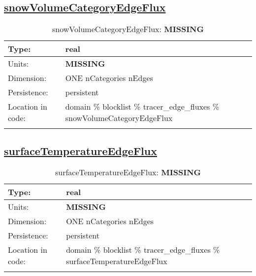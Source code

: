\subsection[snowVolumeCategoryEdgeFlux]{\hyperref[sec:var_tab_tracer_edge_fluxes]{snowVolumeCategoryEdgeFlux}}
\label{subsec:var_sec_tracer_edge_fluxes_snowVolumeCategoryEdgeFlux}
\begin{center}
\begin{longtable}{| p{2.0in} | p{4.0in} |}
        \hline 
        Type: & real \\
        \hline 
        Units: & {\bf \color{red} MISSING} \\
        \hline 
        Dimension: & ONE nCategories nEdges \\
        \hline 
        Persistence: & persistent \\
        \hline 
         Location in code: & domain \% blocklist \% tracer\_edge\_fluxes \% snowVolumeCategoryEdgeFlux \\
         \hline 
    \caption{snowVolumeCategoryEdgeFlux: {\bf \color{red} MISSING}}
\end{longtable}
\end{center}
\subsection[surfaceTemperatureEdgeFlux]{\hyperref[sec:var_tab_tracer_edge_fluxes]{surfaceTemperatureEdgeFlux}}
\label{subsec:var_sec_tracer_edge_fluxes_surfaceTemperatureEdgeFlux}
\begin{center}
\begin{longtable}{| p{2.0in} | p{4.0in} |}
        \hline 
        Type: & real \\
        \hline 
        Units: & {\bf \color{red} MISSING} \\
        \hline 
        Dimension: & ONE nCategories nEdges \\
        \hline 
        Persistence: & persistent \\
        \hline 
         Location in code: & domain \% blocklist \% tracer\_edge\_fluxes \% surfaceTemperatureEdgeFlux \\
         \hline 
    \caption{surfaceTemperatureEdgeFlux: {\bf \color{red} MISSING}}
\end{longtable}
\end{center}
